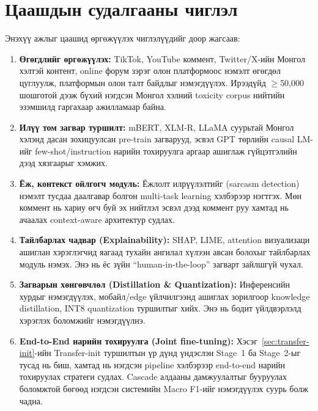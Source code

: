 \section{Цаашдын судалгааны чиглэл}

Энэхүү ажлыг цаашид өргөжүүлэх чиглэлүүдийг доор жагсаав:

\begin{enumerate}
  \item \textbf{Өгөгдлийг өргөжүүлэх:} TikTok, YouTube коммент, Twitter/X-ийн
    Монгол хэлтэй контент, online форум зэрэг олон платформоос нэмэлт
    өгөгдөл цуглуулж, платформын олон талт байдлыг нэмэгдүүлэх. Ирээдүйд
    $\geq$50,000 шошготой дээж бүхий нэгдсэн Монгол хэлний toxicity corpus
    нийтийн эзэмшилд гаргахаар ажилламаар байна.
  \item \textbf{Илүү том загвар туршилт:} mBERT, XLM-R, LLaMA суурьтай
    Монгол хэлэнд дасан зохицуулсан pre-train загварууд, эсвэл GPT
    төрлийн causal LM-ийг few-shot/instruction нарийн тохируулга аргаар
    ашиглаж гүйцэтгэлийн дээд хязгаарыг хэмжих.
  \item \textbf{Ёж, контекст ойлгогч модуль:} Ёжлолт илрүүлэлтийг (sarcasm detection) нэмэлт
    тусдаа даалгавар болгон multi-task learning хэлбэрээр нэгтгэх. Мөн
    коммент нь хариу өгч буй эх нийтлэл эсвэл дээд коммент руу хамтад нь
    ачаалах context-aware архитектур судлах.
  \item \textbf{Тайлбарлах чадвар (Explainability):} SHAP, LIME, attention
    визуализаци ашиглан хэрэглэгчид яагаад тухайн ангилал хүлээн авсан
    болохыг тайлбарлах модуль нэмэх. Энэ нь ёс зүйн ``human-in-the-loop''
    загварт зайлшгүй чухал.
  \item \textbf{Загварын хөнгөвчлөл (Distillation \& Quantization):}
    Инференсийн хурдыг нэмэгдүүлэх, мобайл/edge үйлчилгээнд ашиглах
    зорилгоор knowledge distillation, INT8 quantization туршилтыг
    хийх. Энэ нь бодит үйлдвэрлэлд хэрэглэх боломжийг нэмэгдүүлнэ.
  \item \textbf{End-to-End нарийн тохируулга (Joint fine-tuning):}
    Хэсэг~\ref{sec:transfer-init}-ийн Transfer-init туршилтын үр дүнд
    үндэслэн Stage~1 ба Stage~2-ыг тусад нь биш, хамтад нь нэгдсэн
    pipeline хэлбэрээр end-to-end нарийн тохируулах стратеги судлах.
    Cascade алдааны дамжуулалтыг бууруулах боломжтой бөгөөд нэгдсэн
    системийн Macro F1-ийг нэмэгдүүлэх суурь болж чадна.
\end{enumerate}

